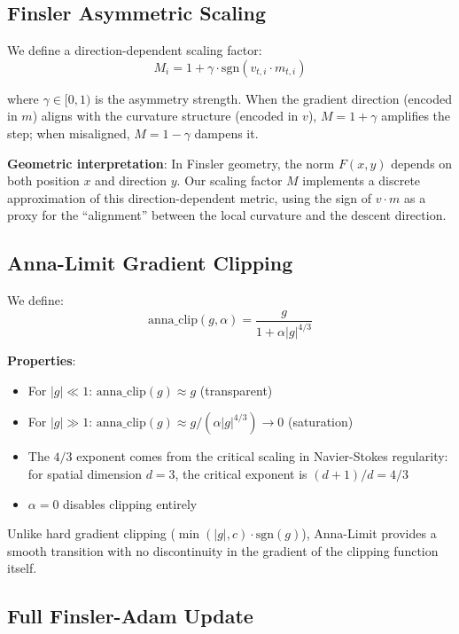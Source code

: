 \documentclass[11pt,a4paper,twocolumn]{article}
\begin{document}
\subsection{Finsler Asymmetric Scaling}

We define a direction-dependent scaling factor:
\begin{equation}
  M_i = 1 + \gamma \cdot \text{sgn}(v_{t,i} \cdot m_{t,i})
\end{equation}

where $\gamma \in [0, 1)$ is the asymmetry strength. When the gradient direction (encoded in $m$) aligns with the curvature structure (encoded in $v$), $M = 1+\gamma$ amplifies the step; when misaligned, $M = 1-\gamma$ dampens it.

\textbf{Geometric interpretation}: In Finsler geometry, the norm $F(x, y)$ depends on both position $x$ and direction $y$. Our scaling factor $M$ implements a discrete approximation of this direction-dependent metric, using the sign of $v \cdot m$ as a proxy for the ``alignment'' between the local curvature and the descent direction.

\subsection{Anna-Limit Gradient Clipping}

We define:
\begin{equation}
  \text{anna\_clip}(g, \alpha) = \frac{g}{1 + \alpha |g|^{4/3}}
\end{equation}

\textbf{Properties}:
\begin{itemize}
  \item For $|g| \ll 1$: $\text{anna\_clip}(g) \approx g$ (transparent)
  \item For $|g| \gg 1$: $\text{anna\_clip}(g) \approx g / (\alpha |g|^{4/3}) \to 0$ (saturation)
  \item The $4/3$ exponent comes from the critical scaling in Navier-Stokes regularity: for spatial dimension $d=3$, the critical exponent is $(d+1)/d = 4/3$
  \item $\alpha = 0$ disables clipping entirely
\end{itemize}

Unlike hard gradient clipping ($\min(|g|, c) \cdot \text{sgn}(g)$), Anna-Limit provides a smooth transition with no discontinuity in the gradient of the clipping function itself.

\subsection{Full Finsler-Adam Update}
\end{document}
